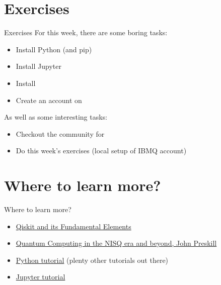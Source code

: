 \documentclass[aspectratio=43]{beamer}
\begin{document}
\section{Exercises}
\begin{frame}{Exercises}
    For this week, there are some boring tasks:
    \begin{itemize}
        \item Install Python (and pip)
        \item Install Jupyter
        \item Install \qk
        \item Create an account on \ibmqe
    \end{itemize}
    As well as some interesting tasks:
    \begin{itemize}
        \item Checkout the community for \qk
        \item Do this week's exercises (local setup of IBMQ account)
    \end{itemize}
\pagenumber
\end{frame}

\section{Where to learn more?}
\begin{frame}{Where to learn more?}
\begin{card}
    \begin{itemize}
        \item \href{https://medium.com/qiskit/qiskit-and-its-fundamental-elements-bcd7ead80492}{Qiskit and its Fundamental Elements}
        \item \href{https://arxiv.org/abs/1801.00862}{Quantum Computing in the NISQ era and beyond, John Preskill}
        \item \href{https://docs.python.org/3/tutorial/}{Python tutorial} (plenty other tutorials out there)
        \item \href{https://www.datacamp.com/community/tutorials/tutorial-jupyter-notebook}{Jupyter tutorial}
    \end{itemize}
\end{card}
\end{frame}
\end{document}
